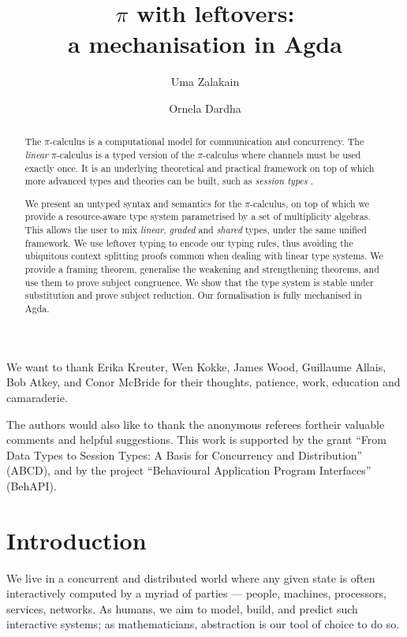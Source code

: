 \documentclass[sigplan,10pt,anonymous,review]{acmart}
\title[$\pi$ with leftovers: a mechanisation in Agda]{$\pi$ with leftovers: \\ a mechanisation in Agda}
\author{Uma Zalakain}
\affiliation{University of Glasgow, Scotland}
\author{Ornela Dardha}
\affiliation{University of Glasgow, Scotland}
\theoremstyle{definition}
\newcommand{\picalc}{$\pi$-calculus}
\begin{document}
\begin{acks}
We want to thank Erika Kreuter, Wen Kokke, James Wood, Guillaume Allais, Bob Atkey, and Conor McBride for their thoughts, patience, work, education and camaraderie.

The authors would also like to thank the anonymous referees fortheir valuable comments and helpful suggestions. This work is supported by the  grant  ``From Data Types to Session Types: A Basis for Concurrency and Distribution'' (ABCD), and by the  project  ``Behavioural Application Program Interfaces'' (BehAPI).
\end{acks}

\begin{abstract}
  The \picalc{} is a computational model for communication and concurrency.
  The \emph{linear} \picalc{} is a typed version of the \picalc{} where channels must be used exactly once.
  It is an underlying theoretical and practical framework on top of which more advanced types and theories can be built, such as \emph{session types} \cite{H93,THK94,HVK98}.

  We present an untyped syntax and semantics for the \picalc{}, on top of which we provide a resource-aware type system parametrised by a set of multiplicity algebras.
  This allows the user to mix \emph{linear}, \emph{graded} and \emph{shared} types, under the same unified framework.
  We use leftover typing \cite{Allais2018a} to encode our typing rules, thus avoiding the ubiquitous context splitting proofs common when dealing with linear type systems.
  We provide a framing theorem, generalise the weakening and strengthening theorems, and use them to prove subject congruence.
  We show that the type system is stable under substitution and prove subject reduction.
%
  Our formalisation is fully mechanised in Agda.
\end{abstract}

\maketitle

\section{Introduction}

We live in a concurrent and distributed world where any given state is often interactively computed by a myriad of parties --- people, machines, processors, services, networks.
As humans, we aim to model, build, and predict such interactive systems; as mathematicians, abstraction is our tool of choice to do so.
\end{document}
